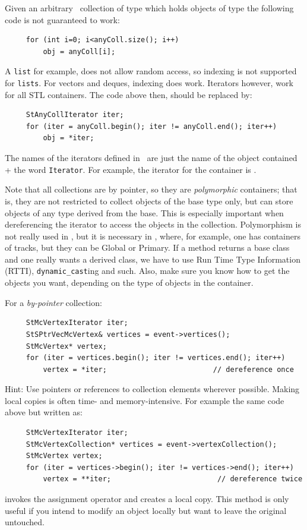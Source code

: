 Given an arbitrary \StMcEvent\ collection  of type
which holds objects of type  the following code is
not guaranteed to work:
\begin{verbatim}
     for (int i=0; i<anyColl.size(); i++)
         obj = anyColl[i];
\end{verbatim}
A {\tt list} for example, does not allow random access, so indexing
is not supported for {\tt lists}.  For vectors and deques, indexing does work.
Iterators however, work for all STL containers.  The code above then,
should be replaced by:
\begin{verbatim}
     StAnyCollIterator iter;
     for (iter = anyColl.begin(); iter != anyColl.end(); iter++)
         obj = *iter;
\end{verbatim}

The names of the iterators defined in \StMcEvent\ are just the name
of the object contained + the word {\tt Iterator}.  For example,
the iterator for the container  is
.

Note that all collections are by pointer, so they are
\textit{polymorphic} containers; that is, they are not restricted to
collect objects of the base type only, but can store
objects of any type derived from
the base. This is especially important when dereferencing the iterator to
access the objects in the collection.  Polymorphism is not
really used in \StMcEvent, but it is necessary in \StEvent, where,
for example, one has containers of tracks, but they can be Global
or Primary.  If a method returns a base class and one really wants
a derived class, we have to use Run Time Type Information (RTTI),
{\tt dynamic\_cast}ing and such.  Also, make sure you know how to
get the objects you want, depending on the type of objects in the
container.

For a \textit{by-pointer} collection:
\begin{verbatim}
     StMcVertexIterator iter;
     StSPtrVecMcVertex& vertices = event->vertices();
     StMcVertex* vertex;
     for (iter = vertices.begin(); iter != vertices.end(); iter++)
         vertex = *iter;                         // dereference once
\end{verbatim}

Hint: Use pointers or references to collection elements wherever
possible.  Making local copies is often time- and memory-intensive.
For example the same code above but written as:
\begin{verbatim}
     StMcVertexIterator iter;
     StMcVertexCollection* vertices = event->vertexCollection();
     StMcVertex vertex;
     for (iter = vertices->begin(); iter != vertices->end(); iter++)
         vertex = **iter;                         // dereference twice
\end{verbatim}
invokes the  assignment operator and creates a local copy.
This method is only useful if you intend to modify an object locally
but want to leave the original untouched.

